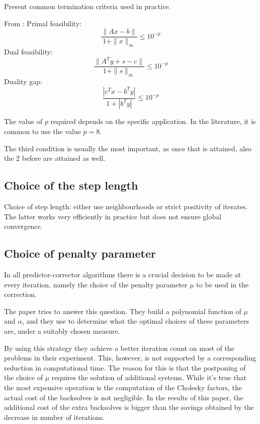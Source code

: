 Present common termination criteria used in practice.

From \cite{GondzioTerlaky}:
Primal feasibility:
\[
\frac{\| Ax - b \|}{1 + \|x\|_\infty} \le10 ^{-p}
\]
Dual feasibility:
\[
\frac{\| A^Ty + s - c \|}{1 + \|s\|_\infty} \le10 ^{-p}
\]
Duality gap:
\[
\frac{| c^Tx - b^Ty |}{1 + | b^Ty |} \le10 ^{-p}
\]

The value of $p$ required depends on the specific application.
In the literature, it is common to use the value $p = 8$.

The third condition is usually the most important, as once that
is attained, also the 2 before are attained as well.


%
%
\subsection{Choice of the step length}

Choice of step length: either use neighbourhoods or strict 
positivity of iterates. The latter works very efficiently 
in practice but does not ensure global convergence.

%
%
\subsection{Choice of penalty parameter}

In all predictor-corrector algorithms there is a crucial decision 
to be made at every iteration, namely the choice of the penalty 
parameter $\mu$ to be used in the correction.

The paper \cite{VillasBoasPerin} tries to answer this question. 
They build a polynomial function of $\mu$ and $\alpha$, and they 
use to determine what the optimal choices of these parameters are, 
under a suitably chosen measure.

By using this strategy they achieve a better iteration count on 
most of the problems in their experiment. This, however, is not 
supported by a corresponding reduction in computational time. 
The reason for this is that the postponing of the choice of $\mu$ 
requires the solution of additional systems. While it's true that 
the most expensive operation is the computation of the Cholesky 
factors, the actual cost of the backsolves is not negligible. 
In the results of this paper, the additional cost of the extra 
backsolves is bigger than the savings obtained by the decrease 
in number of iterations.
